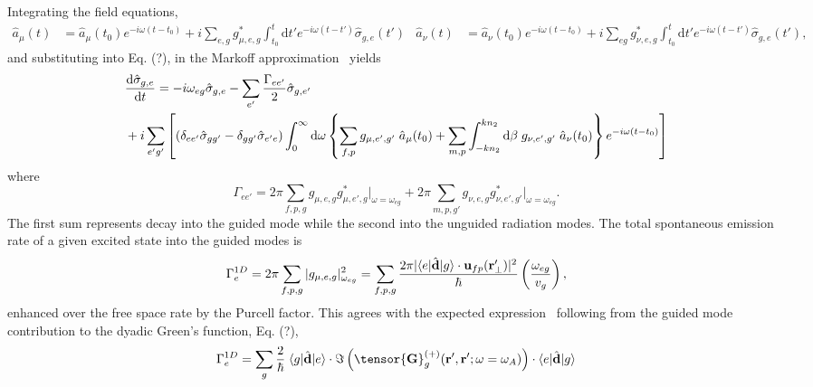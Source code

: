 \documentclass[preprint,aps,pra,onecolumn]{revtex4-1} %
\begin{document}
Integrating the field equations, 
\begin{subequations}\label{eq:aout1}
\begin{align}
\hat{a}_\mu(t) &= \hat{a}_\mu(t_0) e^{-i\omega (t-t_0)} +i \sum_{e,g} g_{\mu,e,g}^* \int_{t_0}^t \mathrm{d} t' e^{-i\omega (t-t')}\hat{\sigma}_{g,e}(t')
\end{align}
\begin{align}
\hat{a}_\nu (t) &= \hat{a}_\nu (t_0) e^{-i\omega (t-t_0)} +i \sum_{eg} g_{\nu,e,g}^* \int_{t_0}^t \mathrm{d} t' e^{-i\omega (t-t')}\hat{\sigma}_{g,e}(t'),
\end{align}
\end{subequations}
and substituting into Eq. (?), in the Markoff approximation~\cite{?} yields
\begin{align}
&\frac{{\mathrm d} {\hat{\sigma}_{g,e}}}{{\mathrm d}t} =-i\omega_{eg} \hat{\sigma}_{g,e}-\sum_{e'}\frac{\Gamma_{ee'}}{2}\hat{\sigma}_{g,e'} \nonumber \\
&+i \sum_{e'g'}\left[ (\delta_{ee'} \hat{\sigma}_{gg'} - \delta_{gg'} \hat{\sigma}_{e'e})\int_0^{\infty}\mathrm{d}\omega \left\{\sum_{f,p}  g_{\mu, e',g'}\; \hat{a}_\mu (t_0) +\sum_{m,p}  \int_{-kn_2}^{kn_2}\mathrm{d}\beta \; g_{\nu, e',g'} \;\hat{a}_\nu(t_0)   \right\} e^{-i\omega (t-t_0)}\right]
\end{align}
where 
\begin{equation}
\Gamma_{ee'} = 2\pi \sum_{f,p,g} g_{\mu,e,g}g^*_{\mu,e',g} \vert_{\omega=\omega_{eg}}+2\pi \sum_{m,p,g'} g_{\nu,e,g}g^*_{\nu,e',g'} \vert_{\omega=\omega_{eg}}.
\end{equation}
The first sum represents decay into the guided mode while the second into the unguided radiation modes.  The total spontaneous emission rate of a given excited state into the guided modes is
\begin{equation}
\Gamma_e^{1D}= 2\pi \sum_{f,p,g} |g_{\mu,e,g}|^2_{\omega_{eg}} =  \sum_{f,p,g}\frac{2 \pi |\langle{e}\rvert\hat{\mathbf{d}}\lvert{g}\rangle \cdot \mathbf{u}_{fp}(\mathbf{r}'_\perp)|^2}{\hbar} \left(\frac{\omega_{eg}}{v_g}\right),
\end{equation}
enhanced over the free space rate by the Purcell factor. This agrees with the expected expression~\cite{?} following from the guided mode contribution to the dyadic Green's function, Eq. (?),
\begin{equation}
\Gamma_e^{1D} = \sum_{g}   \frac{2}{\hbar} \; \bra{g}\hat{\mathbf{d}}\ket{e}\cdot \Im\left(\tensor{\mathbf{G}}^{(+)}_g(\br', \br'; \omega= \omega_A) \right) \cdot \bra{e}\hat{\mathbf{d}}\ket{g}
\end{equation}
\end{document}
